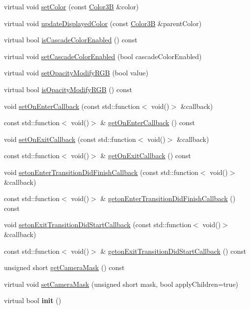 \begin{DoxyCompactItemize}
\item 
virtual void \hyperlink{classNode_a2360069ccef753ff1f9665d0e2d3f83a}{set\+Color} (const \hyperlink{structColor3B}{Color3B} \&color)
\item 
virtual void \hyperlink{classNode_a9e96bdf8038cd786486941f2f5a712ea}{update\+Displayed\+Color} (const \hyperlink{structColor3B}{Color3B} \&parent\+Color)
\item 
virtual bool \hyperlink{classNode_a4ade1991e3cff2c032d50fc7f7392764}{is\+Cascade\+Color\+Enabled} () const
\item 
virtual void \hyperlink{classNode_a0638fb9f5b4c522e75ee4ad01393bb48}{set\+Cascade\+Color\+Enabled} (bool cascade\+Color\+Enabled)
\item 
virtual void \hyperlink{classNode_a03297671eb3440831666a3aa25875f1d}{set\+Opacity\+Modify\+R\+GB} (bool value)
\item 
virtual bool \hyperlink{classNode_af7bb22bd30b2ab6f1534518db6895b87}{is\+Opacity\+Modify\+R\+GB} () const
\item 
void \hyperlink{classNode_a69c42f72323ef791d720b9083f480cb4}{set\+On\+Enter\+Callback} (const std\+::function$<$ void()$>$ \&callback)
\item 
const std\+::function$<$ void()$>$ \& \hyperlink{classNode_ad7b097bc5f33406aa84f0b31cabc8c91}{get\+On\+Enter\+Callback} () const
\item 
void \hyperlink{classNode_a82e2254c47969bfa81be037230738367}{set\+On\+Exit\+Callback} (const std\+::function$<$ void()$>$ \&callback)
\item 
const std\+::function$<$ void()$>$ \& \hyperlink{classNode_ab0b4c33e5b8ef5770d0f4d8ed410e596}{get\+On\+Exit\+Callback} () const
\item 
void \hyperlink{classNode_aad666c48b3a6952c3c4b6c4c1eb446ad}{seton\+Enter\+Transition\+Did\+Finish\+Callback} (const std\+::function$<$ void()$>$ \&callback)
\item 
const std\+::function$<$ void()$>$ \& \hyperlink{classNode_af905ed9ea4b7884fdb9be2b8b2fbcf53}{geton\+Enter\+Transition\+Did\+Finish\+Callback} () const
\item 
void \hyperlink{classNode_aca0270c92c148c57b0605aae8298e356}{seton\+Exit\+Transition\+Did\+Start\+Callback} (const std\+::function$<$ void()$>$ \&callback)
\item 
const std\+::function$<$ void()$>$ \& \hyperlink{classNode_a306d572d520d31dd83ed3eedd2b78d4e}{geton\+Exit\+Transition\+Did\+Start\+Callback} () const
\item 
unsigned short \hyperlink{classNode_a1c849d2d0bd878a4e3dd1a52ab90fee8}{get\+Camera\+Mask} () const
\item 
virtual void \hyperlink{classNode_ad9901c9b33e733877b2c4a47af38787d}{set\+Camera\+Mask} (unsigned short mask, bool apply\+Children=true)
\item 
\mbox{\label{classNode_ae5e2db56bbd63f35deb06da5e64a574d}} 
virtual bool {\bfseries init} ()
\end{DoxyCompactItemize}
